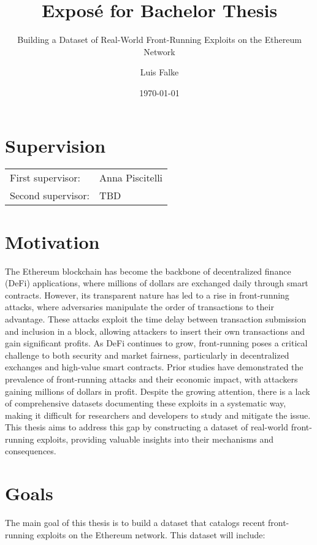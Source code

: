 \documentclass{scrartcl}
\title{Exposé for Bachelor Thesis}
\subtitle{Building a Dataset of Real-World Front-Running Exploits on the Ethereum Network}
\author{Luis Falke}
\date{\today}
\begin{document}
\maketitle

\section*{Supervision}

\begin{tabular}{ll}
	First supervisor:  & Anna Piscitelli \\
	Second supervisor: & TBD             \\
\end{tabular}

\section*{Motivation}

The Ethereum blockchain has become the backbone of decentralized finance (DeFi) applications, where millions of dollars are exchanged daily through smart contracts. However, its transparent nature has led to a rise in front-running attacks, where adversaries manipulate the order of transactions to their advantage. These attacks exploit the time delay between transaction submission and inclusion in a block, allowing attackers to insert their own transactions and gain significant profits. As DeFi continues to grow, front-running poses a critical challenge to both security and market fairness, particularly in decentralized exchanges and high-value smart contracts. Prior studies have demonstrated the prevalence of front-running attacks and their economic impact, with attackers gaining millions of dollars in profit\cite{Perez21,Torres21}. Despite the growing attention, there is a lack of comprehensive datasets documenting these exploits in a systematic way, making it difficult for researchers and developers to study and mitigate the issue. This thesis aims to address this gap by constructing a dataset of real-world front-running exploits, providing valuable insights into their mechanisms and consequences.

\section*{Goals}

The main goal of this thesis is to build a dataset that catalogs recent front-running exploits on the Ethereum network. This dataset will include:
\end{document}
